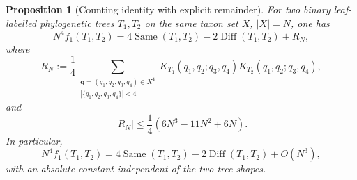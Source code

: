 \documentclass[11pt]{article}
\newtheorem{proposition}[theorem]{Proposition}
\newcommand{\Same}{\operatorname{Same}}
\newcommand{\Diff}{\operatorname{Diff}}
\begin{document}
\begin{proposition}[Counting identity with explicit remainder]
\label{prop:counting-identity}
For two binary leaf-labelled phylogenetic trees $T_1,T_2$ on the same taxon
set $X$, $|X|=N$, one has
\begin{equation}\label{eq:counting-identity-explicit}
 N^4f_1(T_1,T_2)
 =4\Same(T_1,T_2)-2\Diff(T_1,T_2)+R_N,
\end{equation}
where
\begin{equation}\label{eq:repeated-remainder-definition}
 R_N:=\frac14
 \sum_{\substack{\boldsymbol q=(q_1,q_2,q_3,q_4)\in X^4\\
 |\{q_1,q_2,q_3,q_4\}|<4}}
 K_{T_1}(q_1,q_2;q_3,q_4)
 K_{T_2}(q_1,q_2;q_3,q_4),
\end{equation}
and
\begin{equation}\label{eq:repeated-remainder-explicit}
 |R_N|\le\frac14(6N^3-11N^2+6N).
\end{equation}
In particular,
\[
 N^4f_1(T_1,T_2)
 =4\Same(T_1,T_2)-2\Diff(T_1,T_2)+O(N^3),
\]
with an absolute constant independent of the two tree shapes.
\end{proposition}
\end{document}
